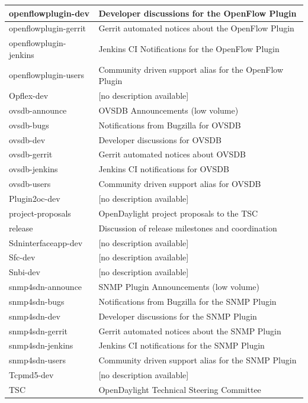 \documentclass[a4paper, 12pt]{book}
\begin{document}
\begin{longtable}{|p{4cm}|p{10cm}|}
openflowplugin-dev &	Developer discussions for the OpenFlow Plugin \\ \hline
openflowplugin-gerrit &	Gerrit automated notices about the OpenFlow Plugin \\ \hline
openflowplugin-jenkins &	Jenkins CI Notifications for the OpenFlow Plugin \\ \hline
openflowplugin-users &	Community driven support alias for the OpenFlow Plugin \\ \hline
Opflex-dev &	[no description available] \\ \hline
ovsdb-announce &	OVSDB Announcements (low volume) \\ \hline
ovsdb-bugs &	Notifications from Bugzilla for OVSDB \\ \hline
ovsdb-dev &	Developer discussions for OVSDB \\ \hline
ovsdb-gerrit &	Gerrit automated notices about OVSDB \\ \hline
ovsdb-jenkins &	Jenkins CI notifications for OVSDB \\ \hline
ovsdb-users &	Community driven support alias for OVSDB \\ \hline
Plugin2oc-dev &	[no description available] \\ \hline
project-proposals &	OpenDaylight project proposals to the TSC \\ \hline
release &	Discussion of release milestones and coordination \\ \hline
Sdninterfaceapp-dev &	[no description available] \\ \hline
Sfc-dev &	[no description available] \\ \hline
Snbi-dev &	[no description available] \\ \hline
snmp4sdn-announce &	SNMP Plugin Announcements (low volume) \\ \hline
snmp4sdn-bugs &	Notifications from Bugzilla for the SNMP Plugin \\ \hline
snmp4sdn-dev &	Developer discussions for the SNMP Plugin \\ \hline
snmp4sdn-gerrit &	Gerrit automated notices about the SNMP Plugin \\ \hline
snmp4sdn-jenkins &	Jenkins CI notifications for the SNMP Plugin \\ \hline
snmp4sdn-users &	Community driven support alias for the SNMP Plugin \\ \hline
Tcpmd5-dev &	[no description available] \\ \hline
TSC &	OpenDaylight Technical Steering Committee \\ \hline

\end{longtable}
\end{document}
